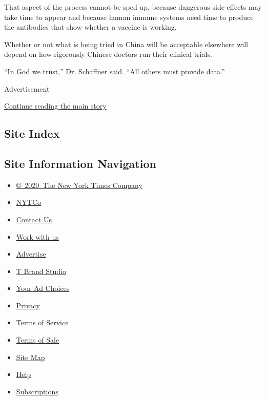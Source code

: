That aspect of the process cannot be sped up, because dangerous side
effects may take time to appear and because human immune systems need
time to produce the antibodies that show whether a vaccine is working.

Whether or not what is being tried in China will be acceptable elsewhere
will depend on how rigorously Chinese doctors run their clinical trials.

``In God we trust,'' Dr. Schaffner said. ``All others must provide
data.''

Advertisement

\protect\hyperlink{after-bottom}{Continue reading the main story}

\hypertarget{site-index}{%
\subsection{Site Index}\label{site-index}}

\hypertarget{site-information-navigation}{%
\subsection{Site Information
Navigation}\label{site-information-navigation}}

\begin{itemize}
\tightlist
\item
  \href{https://help.nytimes3xbfgragh.onion/hc/en-us/articles/115014792127-Copyright-notice}{©~2020~The
  New York Times Company}
\end{itemize}

\begin{itemize}
\tightlist
\item
  \href{https://www.nytco.com/}{NYTCo}
\item
  \href{https://help.nytimes3xbfgragh.onion/hc/en-us/articles/115015385887-Contact-Us}{Contact
  Us}
\item
  \href{https://www.nytco.com/careers/}{Work with us}
\item
  \href{https://nytmediakit.com/}{Advertise}
\item
  \href{http://www.tbrandstudio.com/}{T Brand Studio}
\item
  \href{https://www.nytimes3xbfgragh.onion/privacy/cookie-policy\#how-do-i-manage-trackers}{Your
  Ad Choices}
\item
  \href{https://www.nytimes3xbfgragh.onion/privacy}{Privacy}
\item
  \href{https://help.nytimes3xbfgragh.onion/hc/en-us/articles/115014893428-Terms-of-service}{Terms
  of Service}
\item
  \href{https://help.nytimes3xbfgragh.onion/hc/en-us/articles/115014893968-Terms-of-sale}{Terms
  of Sale}
\item
  \href{https://spiderbites.nytimes3xbfgragh.onion}{Site Map}
\item
  \href{https://help.nytimes3xbfgragh.onion/hc/en-us}{Help}
\item
  \href{https://www.nytimes3xbfgragh.onion/subscription?campaignId=37WXW}{Subscriptions}
\end{itemize}
